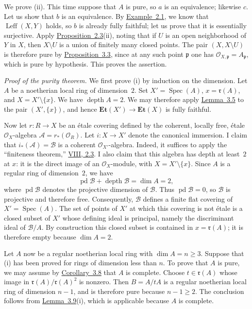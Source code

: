 \documentclass[11pt,a4paper,oneside]{book}
\providecommand{\Et}{\mathbf{Et}}
\providecommand{\Spec}{\operatorname{Spec}}
\providecommand{\depthop}{\operatorname{depth}}
\providecommand{\pdop}{\operatorname{pd}}
\providecommand{\Leffc}{\operatorname{Leff}}
\theoremstyle{plain}
\theoremstyle{definition}
\theoremstyle{remark}
\begin{document}
We prove \textup{(ii)}. This time suppose that $A$ is pure, so $a$ is an
equivalence; likewise $c$. Let us show that $b$ is an equivalence. By
\hyperref[X.2.1]{Example~2.1}, we know that $\Leffc(X,Y)$ holds, so $b$ is already fully
faithful; let us prove that it is essentially surjective. Apply
\hyperref[X.2.3]{Proposition~2.3}\textup{(ii)}, noting that if $U$ is an open neighborhood of
$Y$ in $X$, then $X\setminus U$ is a union of finitely many closed points.
The pair $(X,X\setminus U)$ is therefore pure by \hyperref[X.3.3]{Proposition~3.3}, since at
any such point $\mathfrak p$ one has
$\mathcal O_{X,\mathfrak p}=A_{\mathfrak p}$, which is pure by hypothesis.
This proves the assertion.

\medskip
\textit{Proof of the purity theorem.}
We first prove \textup{(i)} by induction on the dimension. Let $A$ be a
noetherian local ring of dimension~$2$. Set
$X'=\Spec(A)$, $x=\mathfrak r(A)$, and $X=X'\setminus\{x\}$. We have
$\depthop A=2$. We may therefore apply \hyperref[X.3.5]{Lemma~3.5} to the pair
$(X',\{x\})$, and hence
$\Et(X')\longrightarrow\Et(X)$ is fully faithful.

Now let $r\colon R\longrightarrow X$ be an \'{e}tale covering defined by
the coherent, locally free, \'{e}tale $\mathcal O_X$-algebra
$\mathcal A=r_*(\mathcal O_R)$. Let $i\colon X\longrightarrow X'$ denote
the canonical immersion. I claim that
$i_*(\mathcal A)=\mathcal B$ is a coherent $\mathcal O_{X'}$-algebra.
Indeed, it suffices to apply the ``finiteness theorem,'' \hyperref[VIII.2.3]{VIII, 2.3}. I also
claim that this algebra has depth at least~$2$ at $x$: it is the direct image
of an $\mathcal O_X$-module, with $X=X'\setminus\{x\}$. Since $A$ is a
regular ring of dimension~$2$, we have
\[
  \pdop \mathcal B+\depthop \mathcal B=\dim A=2,
\]
where $\pdop \mathcal B$ denotes the projective dimension of $\mathcal B$.
Thus $\pdop \mathcal B=0$, so $\mathcal B$ is projective and therefore
free. Consequently, $\mathcal B$ defines a finite flat covering of
$X'=\Spec(A)$. The set of points of $X'$ at which this covering is not
\'{e}tale is a closed subset of $X'$ whose defining ideal is principal,
namely the discriminant ideal of $\mathcal B/A$. By construction this closed
subset is contained in $x=\mathfrak r(A)$; it is therefore empty because
$\dim A=2$.

Let $A$ now be a regular noetherian local ring with $\dim A=n\geq 3$.
Suppose that \textup{(i)} has been proved for rings of dimension less than
$n$. To prove that $A$ is pure, we may assume by \hyperref[X.3.8]{Corollary~3.8} that $A$ is
complete. Choose $t\in\mathfrak r(A)$ whose image in
$\mathfrak r(A)/\mathfrak r(A)^2$ is nonzero. Then $B=A/tA$ is a regular
noetherian local ring of dimension $n-1$, and is therefore pure because
$n-1\geq 2$. The conclusion follows from \hyperref[X.3.9]{Lemma~3.9}\textup{(i)}, which is
applicable because $A$ is complete.
\end{document}
